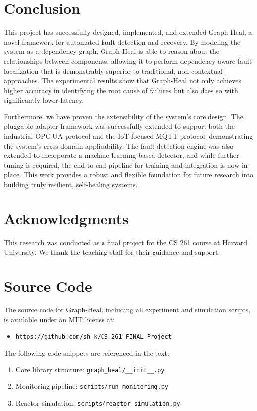 \documentclass[11pt,conference]{IEEEtran}
\begin{document}
\section{Conclusion}
\label{sec:conclusion}
This project has successfully designed, implemented, and extended Graph-Heal, a novel framework for automated fault detection and recovery. By modeling the system as a dependency graph, Graph-Heal is able to reason about the relationships between components, allowing it to perform dependency-aware fault localization that is demonstrably superior to traditional, non-contextual approaches. The experimental results show that Graph-Heal not only achieves higher accuracy in identifying the root cause of failures but also does so with significantly lower latency.

Furthermore, we have proven the extensibility of the system's core design. The pluggable adapter framework was successfully extended to support both the industrial OPC-UA protocol and the IoT-focused MQTT protocol, demonstrating the system's cross-domain applicability. The fault detection engine was also extended to incorporate a machine learning-based detector, and while further tuning is required, the end-to-end pipeline for training and integration is now in place. This work provides a robust and flexible foundation for future research into building truly resilient, self-healing systems.

\section*{Acknowledgments}
This research was conducted as a final project for the CS 261 course at Harvard University. We thank the teaching staff for their guidance and support.




\appendix
\section*{Source Code}

The source code for Graph-Heal, including all experiment and simulation scripts, is available under an MIT license at:
\begin{itemize}
    \item \texttt{https://github.com/sh-k/CS\_261\_FINAL\_Project}
\end{itemize}

The following code snippets are referenced in the text:
\begin{enumerate}
    \item Core library structure: \texttt{graph\_heal/\_\_init\_\_.py}
    \item Monitoring pipeline: \texttt{scripts/run\_monitoring.py}
    \item Reactor simulation: \texttt{scripts/reactor\_simulation.py}
\end{enumerate}
\end{document}
